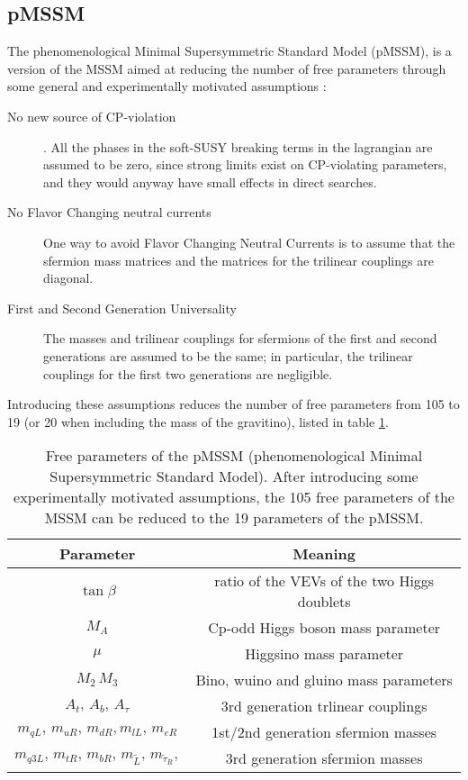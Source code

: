 \subsection{pMSSM}

The phenomenological Minimal Supersymmetric Standard Model (pMSSM), is a version of the MSSM aimed at reducing the number of free parameters through some general and experimentally motivated assumptions \cite{djouadi:MSSM}:

\begin{description}
\item[No new source of CP-violation]. All the phases in the soft-SUSY breaking terms in the lagrangian are assumed to be zero, since strong limits exist on CP-violating parameters, and they would anyway have small effects in direct searches.

\item[No Flavor Changing neutral currents] One way to avoid Flavor Changing Neutral Currents is to assume that the sfermion mass matrices and the matrices for the trilinear couplings are diagonal.

\item[First and Second Generation Universality] The masses and trilinear couplings for sfermions of the first and second generations are assumed to be the same; in particular, the trilinear couplings for the first two generations are negligible.
\end{description}

Introducing these assumptions reduces the number of free parameters from 105 to 19 (or 20 when including the mass of the gravitino), listed in table \ref{tab:pMMSpar}.

\begin{table}[h]
\centering
\begin{tabular}{c c}
\hline 
Parameter & Meaning \\ 
\hline 
\hline
$\tan \beta$ & ratio of the VEVs of the two Higgs doublets \\ 
\hline 
$M_A$ & Cp-odd Higgs boson mass parameter \\ 
\hline 
$\mu$ & Higgsino mass parameter \\ 
\hline 
$M_2  \, M_3 $ & Bino, wuino and gluino mass parameters \\ 
\hline 
$  A_t, \, A_b, \, A_\tau    $ & 3rd generation trlinear couplings \\ 
\hline 
$m_{qL},  \,  m_{uR},  \, m_{dR},  m_{lL},  \, m_{eR}$ & 1st/2nd generation sfermion masses \\ 
\hline 
 $m_{q3L}, \, m_{tR}, \, m_{bR}, \, m_{\tilde{L}}, \, m_{\tilde{\tau}_R},$ & 3rd generation sfermion masses \\ 
\hline 
\end{tabular} 
\caption[Free parameters of the pMSSM]{\label{tab:pMMSpar}Free parameters of the pMSSM (phenomenological Minimal Supersymmetric Standard Model). After introducing some experimentally motivated assumptions, the 105 free parameters of the MSSM can be reduced to the 19 parameters of the pMSSM.}
\end{table}

